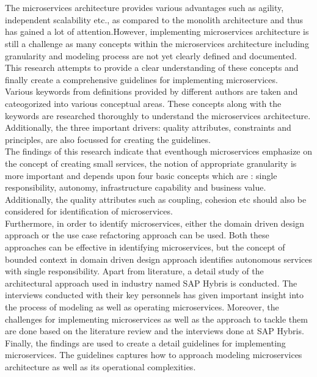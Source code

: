 \chapter{\abstractname}
The microservices architecture provides various advantages such as agility, independent scalability etc., as compared to the monolith architecture and thus has gained a lot of attention.However, implementing microservices architecture is still a challenge as many concepts within the microservices architecture including granularity and modeling process are not yet clearly defined and documented. This research attempts to provide a clear understanding of these concepts and finally create a comprehensive guidelines for implementing microservices.\\
Various keywords from definitions provided by different authors are taken and cateogorized into various conceptual areas. These concepts along with the keywords are researched thoroughly to understand the microservices architecture. Additionally, the three important drivers: quality attributes, constraints and principles, are also focussed for creating the guidelines.\\
The findings of this research indicate that eventhough microservices emphasize on the concept of creating small services, the notion of appropriate granularity is more important and depends upon four basic concepts which are : single responsibility, autonomy, infrastructure capability and business value. Additionally, the quality attributes such as coupling, cohesion etc should also be considered for identification of microservices.\\
Furthermore, in order to identify microservices, either the domain driven design approach or the use case refactoring approach can be used. Both these approaches can be effective in identifying microservices, but the concept of bounded context in domain driven design approach identifies autonomous services with single responsibility. Apart from literature, a detail study of the architectural approach used in industry named SAP Hybris is conducted. The interviews conducted with their key personnels has given important insight into the process of modeling as well as operating microservices. Moreover, the challenges for implementing microservices as well as the approach to tackle them are done based on the literature review and the interviews done at SAP Hybris.\\
Finally, the findings are used to create a detail guidelines for implementing microservices. The guidelines captures how to approach modeling microservices architecture as well as its operational complexities.